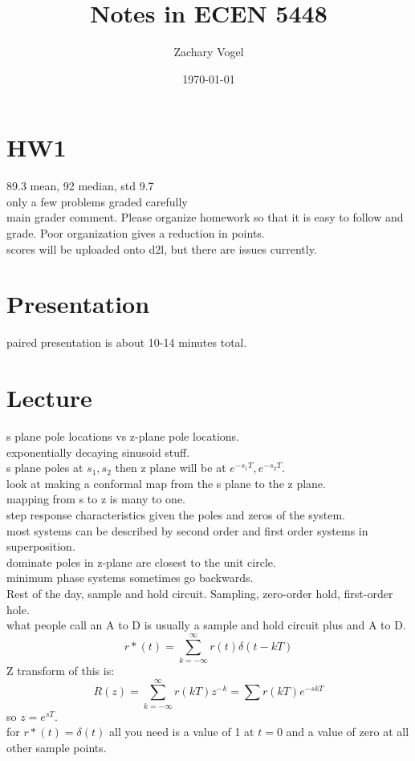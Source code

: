 \documentclass{article}
\author{Zachary Vogel}
\date{\today}
\title{Notes in ECEN 5448}
\begin{document}
\maketitle


\section*{HW1}
89.3 mean, 92 median, std 9.7\\
only a few problems graded carefully\\
main grader comment. Please organize homework so that it is easy to follow and grade. Poor organization gives a reduction in points.\\
scores will be uploaded onto d2l, but there are issues currently.

\section*{Presentation}
paired presentation is about 10-14 minutes total.


\section*{Lecture}
s plane pole locations vs z-plane pole locations.\\
exponentially decaying sinusoid stuff.\\
s plane poles at $s_1,s_2$ then z plane will be at $e^{-s_1 T},e^{-s_2 T}$.\\
look at making a conformal map from the s plane to the z plane.\\
mapping from s to z is many to one.\\
step response characteristics given the poles and zeros of the system.\\
most systems can be described by second order and first order systems in superposition.\\
dominate poles in z-plane are closest to the unit circle.\\

minimum phase systems sometimes go backwards.\\

Rest of the day, sample and hold circuit. Sampling, zero-order hold, first-order hole.\\
what people call an A to D is usually a sample and hold circuit plus and A to D.\\


\[r*(t)=\sum_{k=-\infty}^\infty r(t)\delta (t-kT)\]
Z transform of this is:
\[R(z)=\sum_{k=-\infty}^\infty r(kT)z^{-k}=\sum r(kT)e^{-skT}\]
so $z=e^{sT}$.\\
for $r*(t)=\delta(t)$ all you need is a value of 1 at $t=0$ and a value of zero at all other sample points.\\
\end{document}
